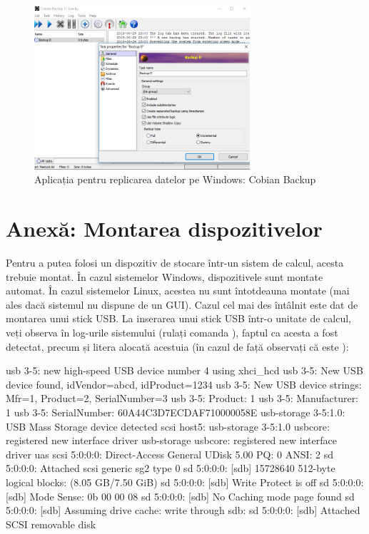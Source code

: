 \begin{figure}[!htbp]
	\centering
	\includegraphics[width=8cm]{chapters/10-storage/img/cobian-img.png}
	\caption{Aplicația pentru replicarea datelor pe Windows: Cobian Backup}
	\label{fig:storage-cobian}
\end{figure}

\section{Anexă: Montarea dispozitivelor}
\label{sec:storage-mount}

Pentru a putea folosi un dispozitiv de stocare într-un sistem de calcul, acesta
trebuie montat. În cazul sistemelor Windows, dispozitivele sunt montate automat.
În cazul sistemelor Linux, acestea nu sunt întotdeauna montate (mai ales dacă
sistemul nu dispune de un GUI). Cazul cel mai des întâlnit este dat de montarea
unui stick USB. La inserarea unui stick USB într-o unitate de calcul, veți
observa în log-urile sistemului (rulați comanda ), faptul ca acesta a
fost detectat, precum și litera alocată acestuia (în cazul de față observați că
este ):

\begin{screen}
usb 3-5: new high-speed USB device number 4 using xhci_hcd
usb 3-5: New USB device found, idVendor=abcd, idProduct=1234
usb 3-5: New USB device strings: Mfr=1, Product=2, SerialNumber=3
usb 3-5: Product: 1
usb 3-5: Manufacturer: 1
usb 3-5: SerialNumber: 60A44C3D7ECDAF710000058E
usb-storage 3-5:1.0: USB Mass Storage device detected
scsi host5: usb-storage 3-5:1.0
usbcore: registered new interface driver usb-storage
usbcore: registered new interface driver uas
scsi 5:0:0:0: Direct-Access     General  UDisk            5.00 PQ: 0 ANSI: 2
sd 5:0:0:0: Attached scsi generic sg2 type 0
sd 5:0:0:0: [sdb] 15728640 512-byte logical blocks: (8.05 GB/7.50 GiB)
sd 5:0:0:0: [sdb] Write Protect is off
sd 5:0:0:0: [sdb] Mode Sense: 0b 00 00 08
sd 5:0:0:0: [sdb] No Caching mode page found
sd 5:0:0:0: [sdb] Assuming drive cache: write through
 sdb:
sd 5:0:0:0: [sdb] Attached SCSI removable disk
\end{screen}


